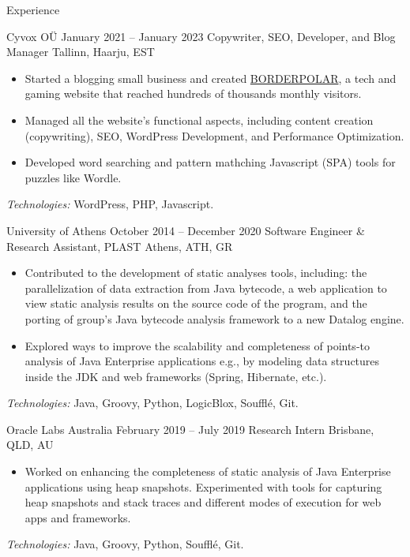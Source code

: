 \documentclass{resume}
\begin{document}
\begin{rSection}{Experience}
  \begin{rSubsection}
    {Cyvox OÜ}
    {January 2021 -- January 2023}
    {Copywriter, SEO, Developer, and Blog Manager}
    {Tallinn, Haarju, EST}
    \begin{itemize}[label={-}]
      \setlength\itemsep{-0.5em}
        \item Started a blogging small business and created \href{http://borderpolar.com}{BORDERPOLAR}, a tech and gaming website that reached hundreds of thousands monthly visitors.
        \item Managed all the website's functional aspects, including content creation (copywriting), SEO, WordPress Development, and Performance Optimization.
        \item Developed word searching and pattern mathching Javascript (SPA) tools for puzzles like Wordle.
    \end{itemize}
  \footnotesize\textcolor{TechsColor}{\textit{Technologies:} WordPress, PHP, Javascript.}
  \end{rSubsection}

\begin{rSubsection}
  {University of Athens}
  {October 2014 -- December 2020}
  {Software Engineer \& Research Assistant, PLAST}
  {Athens, ATH, GR}
  \begin{itemize}[label={-}]
    \setlength\itemsep{-0.5em}
    \item Contributed to the development of static analyses tools, including: the parallelization of data extraction from Java bytecode, a web application to view static analysis results on the source code of the program, and the porting of group's Java bytecode analysis framework to a new Datalog engine.
    \item Explored ways to improve the scalability and completeness of points-to analysis of Java Enterprise applications e.g., by modeling data structures inside the JDK and web frameworks (Spring, Hibernate, etc.).
  \end{itemize}
\footnotesize\textcolor{TechsColor}{\textit{Technologies:} Java, Groovy, Python, LogicBlox, Soufflé, Git.}
\end{rSubsection}

\begin{rSubsection}
  {Oracle Labs Australia}
  {February 2019 -- July 2019}
  {Research Intern}
  {Brisbane, QLD, AU}
  \begin{itemize}[label={-}]
    \setlength\itemsep{-0.5em}
    \item Worked on enhancing the completeness of static analysis of Java Enterprise applications using heap snapshots. Experimented with tools for capturing heap snapshots and stack traces and different modes of execution for web apps and frameworks.
  \end{itemize}
\footnotesize\textcolor{TechsColor}{\textit{Technologies:} Java, Groovy, Python, Soufflé, Git.}
\end{rSubsection}


\end{rSection}
\end{document}
